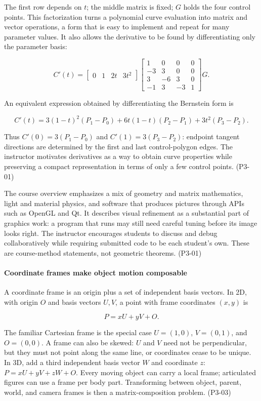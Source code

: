 The first row depends on \(t\); the middle matrix is fixed; \(G\) holds the four control points. This factorization turns a polynomial curve evaluation into matrix and vector operations, a form that is easy to implement and repeat for many parameter values. It also allows the derivative to be found by differentiating only the parameter basis:

\[
C'(t)=\begin{bmatrix}0&1&2t&3t^2\end{bmatrix}
\begin{bmatrix}1&0&0&0\\-3&3&0&0\\3&-6&3&0\\-1&3&-3&1\end{bmatrix}G.
\]

An equivalent expression obtained by differentiating the Bernstein form is

\[
C'(t)=3(1-t)^2(P_1-P_0)+6t(1-t)(P_2-P_1)+3t^2(P_3-P_2).
\]

Thus \(C'(0)=3(P_1-P_0)\) and \(C'(1)=3(P_3-P_2)\): endpoint tangent directions are determined by the first and last control-polygon edges. The instructor motivates derivatives as a way to obtain curve properties while preserving a compact representation in terms of only a few control points. (P3-01)

The course overview emphasizes a mix of geometry and matrix mathematics, light and material physics, and software that produces pictures through APIs such as OpenGL and Qt. It describes visual refinement as a substantial part of graphics work: a program that runs may still need careful tuning before its image looks right. The instructor encourages students to discuss and debug collaboratively while requiring submitted code to be each student's own. These are course-method statements, not geometric theorems. (P3-01)

\paragraph{Coordinate frames make object motion composable}\label{coordinate-frames-make-object-motion-composable}

A coordinate frame is an origin plus a set of independent basis vectors. In 2D, with origin \(O\) and basis vectors \(U,V\), a point with frame coordinates \((x,y)\) is

\[
P=xU+yV+O.
\]

The familiar Cartesian frame is the special case \(U=(1,0)\), \(V=(0,1)\), and \(O=(0,0)\). A frame can also be skewed: \(U\) and \(V\) need not be perpendicular, but they must not point along the same line, or coordinates cease to be unique. In 3D, add a third independent basis vector \(W\) and coordinate \(z\): \(P=xU+yV+zW+O\). Every moving object can carry a local frame; articulated figures can use a frame per body part. Transforming between object, parent, world, and camera frames is then a matrix-composition problem. (P3-03)

